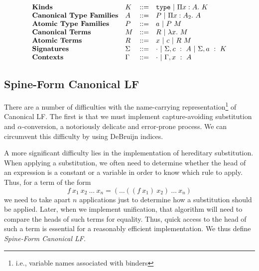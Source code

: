 $$
\begin{array}{llll}
\textbf{Kinds} & K & ::= & \mathtt{type} \ |\  \Pi x : A.\ K \\
\textbf{Canonical Type Families} & A & ::= & P \ |\  \Pi x : A_2.\ A \\
\textbf{Atomic Type Families} & P & ::= & a \ |\  P\ M \\
\textbf{Canonical Terms} & M & ::= & R \ |\  \lambda x.\ M \\
\textbf{Atomic Terms} & R & ::= &  x \ |\  c \ |\  R\ M\\
\textbf{Signatures} & \Sigma & ::= & \cdot \ |\  \Sigma,c\ :\ A 
\ |\  \Sigma,a\ :\ K\\
\textbf{Contexts} & \Gamma & ::= & \cdot \ |\  \Gamma,x\ :\ A\\
\end{array}
$$


\subsection{Spine-Form Canonical LF}

There are a number of difficulties with the name-carrying 
representation\footnote{i.e., variable names associated with binders}
of Canonical LF.  The first is that we must
implement capture-avoiding substitution and $\alpha$-conversion,
a notoriously delicate and error-prone process.
We can circumvent this difficulty
by using DeBruijn indices\cite{DeBruijn:1972:Terms}. 

 A more significant 
difficulty lies in the implementation of hereditary substitution. 
When applying a substitution, we often need to determine whether
the head of an expression is a constant or a variable in order
to know which rule to apply.  Thus, for a term of the form
$$f\ x_1\ x_2\ \ldots\ x_n = (\ldots((f\ x_1)\ x_2)\ \ldots\ x_n) $$
we need to take apart $n$ applications just to determine how
a substitution should be applied.  Later, when we implement
unification, that algorithm will need to compare the heads
of such terms for equality.  Thus, quick access to the head
of such a term is essential for a reasonably efficient implementation.
We thus define \emph{Spine-Form Canonical LF}.

